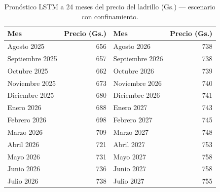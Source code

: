 \begin{table}[H]
\centering
\caption{Pronóstico LSTM a 24 meses del precio del ladrillo (Gs.) --- escenario con confinamiento.}
\label{tab:lstm_ladrillo_pred_con_covid}
\begin{tabular}{lr|lr}
\toprule
\textbf{Mes} & \textbf{Precio (Gs.)} & \textbf{Mes} & \textbf{Precio (Gs.)} \\
\midrule
Agosto 2025      & 656 & Agosto 2026      & 738 \\
Septiembre 2025  & 657 & Septiembre 2026  & 738 \\
Octubre 2025     & 662 & Octubre 2026     & 739 \\
Noviembre 2025   & 673 & Noviembre 2026   & 740 \\
Diciembre 2025   & 680 & Diciembre 2026   & 741 \\
Enero 2026       & 688 & Enero 2027       & 743 \\
Febrero 2026     & 698 & Febrero 2027     & 745 \\
Marzo 2026       & 709 & Marzo 2027       & 748 \\
Abril 2026       & 721 & Abril 2027       & 753 \\
Mayo 2026        & 731 & Mayo 2027        & 758 \\
Junio 2026       & 736 & Junio 2027       & 758 \\
Julio 2026       & 738 & Julio 2027       & 755 \\
\bottomrule
\end{tabular}
\end{table}
